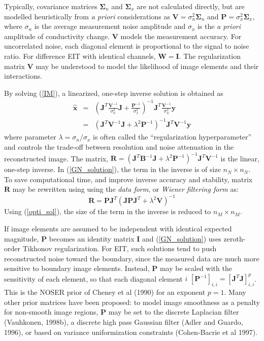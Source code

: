 \documentclass[12pt]{iopart}
\newcommand{\xH}{\mbox{$\mathbf{\hat x}$}}
\newcommand{\yB}{\mbox{$\mathbf{y}$}}
\newcommand{\BB}{\mbox{$\mathbf{B}$}}
\newcommand{\RB}{\mbox{$\mathbf{R}$}}
\newcommand{\IB}{\mbox{$\mathbf{I}$}}
\newcommand{\JB}{\mbox{$\mathbf{J}$}}
\renewcommand{\PB}{\mbox{$\mathbf{P}$}}
\newcommand{\VB}{\mbox{$\mathbf{V}$}}
\newcommand{\WB}{\mbox{$\mathbf{W}$}}
\newcommand{\SG}{\mbox{${\mathbf \Sigma}$}}
\begin{document}
Typically,  covariance matrices
$\SG_n$ and $\SG_x$ are not calculated directly, but
are modelled heuristically from {\em a priori}
considerations as 
 $\VB = \sigma_n^{2}\SG_n$
 and
 $\PB = \sigma_x^{2}\SG_x$,
where $\sigma_n$ is the average measurement noise amplitude and
$\sigma_x$ is the {\em a priori} amplitude of conductivity change.
$\VB$ models the measurement accuracy. For uncorrelated noise,
each diagonal element is proportional to the signal to noise
ratio. For difference EIT with identical channels, $\WB=\IB$. The
regularization matrix $\VB$ may be understood to model the
likelihood of image elements and their interactions.

By solving (\ref{IM}), a linearized, one-step inverse solution is
obtained as
\begin{eqnarray}\label{GN_solution}
\xH&=&\left(
    \JB^T \frac{\VB^{-1}}{\sigma_n^2} \JB 
     +
    \frac{\PB^{-1}}{\sigma_x^2} 
    \right)^{-1}
    \JB^T \frac{\VB^{-1}}{\sigma_n^2}\yB
\nonumber \\
   &=&\left(
    \JB^T \VB^{-1} \JB + \lambda^2 \PB^{-1}
    \right)^{-1}
    \JB^T \VB^{-1} \yB
\end{eqnarray}
where parameter  $\lambda=\sigma_n/\sigma_x$ is
often called the ``regularization hyperparameter'' and
controls the trade-off
between resolution and noise attenuation in the reconstructed
image.
The matrix,
$\RB=\left(\JB^T\BB^{-1}\JB+\lambda^2\PB^{-1}\right)^{-1}\JB^T\VB^{-1}$
is the linear, one-step inverse.
In (\ref{GN_solution}), the term in the inverse is of size
$n_N\times n_N$. To save computational time, and improve inverse
accuracy and stability, matrix $\RB$ may be rewritten using
using the {\em data form}, or {\em Wiener filtering form} as:
\begin{equation}\label{opti_sol}
 \RB =\PB\JB^T
    \left(
       \JB\PB\JB^T+\lambda^2\VB
   \right)^{-1}
\end{equation}
Using (\ref{opti_sol}), the size of the term in the inverse is
reduced to $n_M\times n_M$.

If image elements are assumed to be independent with identical
expected magnitude, $\PB$ becomes an identity matrix $\IB$ and
(\ref{GN_solution}) uses zeroth-order Tikhonov regularization. For
EIT, such solutions tend to push reconstructed noise toward the
boundary, since the measured data are much more sensitive to
boundary image elements. Instead, $\PB$ may be scaled with the
sensitivity of each element, so that each diagonal element $i$ 
$[\PB^{-1}]_{i,i} = \left[ \JB^T \JB
\right]_{i,i}^p$. This is the NOSER prior of Cheney et al (1990)
for an exponent $p=1$. Many other prior matrices have been
proposed: to model image smoothness as a penalty for non-smooth
image regions, $\PB$ may be set to the discrete Laplacian filter
(Vauhkonen, 1998b), a discrete high pass Gaussian filter (Adler
and Guardo, 1996), or based on variance uniformization
constraints (Cohen-Bacrie et al 1997).
\end{document}
